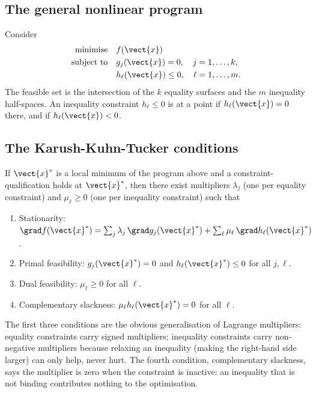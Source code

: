\subsection{The general nonlinear program}

Consider
\begin{align*}
\text{minimise}\quad & f(\vect{x}) \\
\text{subject to}\quad & g_{j}(\vect{x}) = 0, \quad j = 1, \ldots, k, \\
& h_{\ell}(\vect{x}) \leq 0, \quad \ell = 1, \ldots, m.
\end{align*}
The feasible set is the intersection of the $k$ equality surfaces
and the $m$ inequality half-spaces. An inequality constraint $h_{\ell}
\leq 0$ is  at a point if $h_{\ell}(\vect{x}) = 0$
there, and  if $h_{\ell}(\vect{x}) < 0$.

\subsection{The Karush-Kuhn-Tucker conditions}

\begin{theorem}
If $\vect{x}^{*}$ is a local minimum of the program above and a
constraint-qualification holds at $\vect{x}^{*}$, then there exist
multipliers $\lambda_{j}$ (one per equality constraint) and
$\mu_{\ell} \geq 0$ (one per inequality constraint) such that
\begin{enumerate}[leftmargin=*]
  \item Stationarity: $\grad f(\vect{x}^{*}) = \sum_{j} \lambda_{j}\,
    \grad g_{j}(\vect{x}^{*}) + \sum_{\ell} \mu_{\ell}\,
    \grad h_{\ell}(\vect{x}^{*})$.
  \item Primal feasibility: $g_{j}(\vect{x}^{*}) = 0$ and
    $h_{\ell}(\vect{x}^{*}) \leq 0$ for all $j, \ell$.
  \item Dual feasibility: $\mu_{\ell} \geq 0$ for all $\ell$.
  \item Complementary slackness: $\mu_{\ell} h_{\ell}(\vect{x}^{*}) =
    0$ for all $\ell$.
\end{enumerate}
\end{theorem}

The first three conditions are the obvious generalisation of
Lagrange multipliers: equality constraints carry signed
multipliers; inequality constraints carry non-negative multipliers
because relaxing an inequality (making the right-hand side larger)
can only help, never hurt. The fourth condition, complementary
slackness, says the multiplier is zero when the constraint is
inactive: an inequality that is not binding contributes nothing to
the optimisation.

